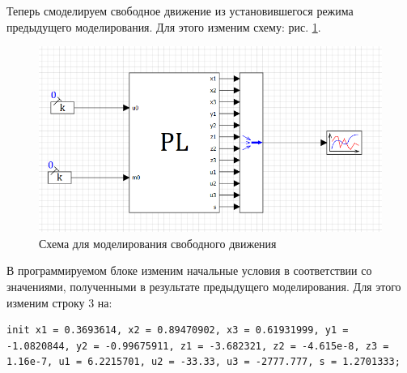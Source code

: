 	Теперь смоделируем свободное движение из установившегося режима предыдущего моделирования. Для этого изменим схему: рис. \ref{scheme2}.
	
	\begin{figure}[h]
		\centering\includegraphics[width=.65\textwidth]{png/scheme2.png}
		\caption{Схема для моделирования свободного движения}
		\label{scheme2}
	\end{figure}
	
	В программируемом блоке изменим начальные условия в соответствии со значениями, полученными в результате предыдущего моделирования. Для этого изменим строку 3 на:
	\begin{listing}[h]
		\begin{verbatim}
init x1 = 0.3693614, x2 = 0.89470902, x3 = 0.61931999, y1 = -1.0820844, y2 = -0.99675911, z1 = -3.682321, z2 = -4.615e-8, z3 = 1.16e-7, u1 = 6.2215701, u2 = -33.33, u3 = -2777.777, s = 1.2701333;
		\end{verbatim}
	\end{listing}
	
